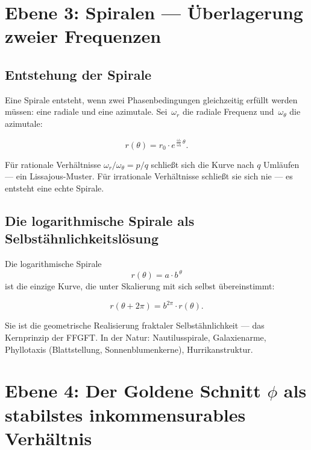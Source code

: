 \section{Ebene 3: Spiralen — Überlagerung zweier Frequenzen}

\subsection{Entstehung der Spirale}

Eine Spirale entsteht, wenn zwei Phasenbedingungen gleichzeitig erfüllt
werden müssen: eine radiale und eine azimutale. Sei~$\omega_r$ die
radiale Frequenz und~$\omega_\theta$ die azimutale:

\begin{equation}
  r(\theta) = r_0 \cdot e^{\,\frac{\omega_r}{\omega_\theta}\,\theta}.
\end{equation}

Für rationale Verhältnisse $\omega_r/\omega_\theta = p/q$ schließt
sich die Kurve nach $q$ Umläufen — ein Lissajous-Muster.
Für irrationale Verhältnisse schließt sie sich nie — es entsteht
eine echte Spirale.

\subsection{Die logarithmische Spirale als Selbstähnlichkeitslösung}

Die logarithmische Spirale
\begin{equation}
  r(\theta) = a \cdot b^{\,\theta}
\end{equation}
ist die einzige Kurve, die unter Skalierung mit sich selbst übereinstimmt:

\begin{equation}
  r(\theta + 2\pi) = b^{2\pi} \cdot r(\theta).
\end{equation}

Sie ist die geometrische Realisierung fraktaler Selbstähnlichkeit —
das Kernprinzip der FFGFT. In der Natur: Nautilusspirale, Galaxienarme,
Phyllotaxis (Blattstellung, Sonnenblumenkerne), Hurrikanstruktur.

\section{Ebene 4: Der Goldene Schnitt $\phi$ als stabilstes
         inkommensurables Verhältnis}

